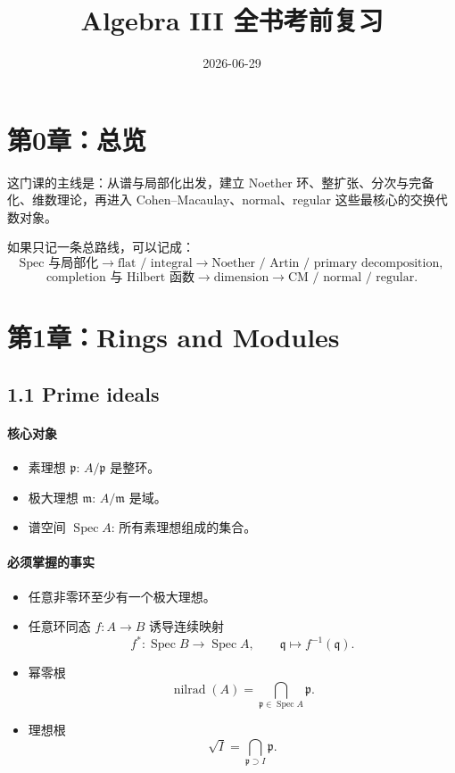 \documentclass[a4paper]{ctexart}
\title{Algebra III 全书考前复习}
\author{}
\date{2026-06-29}
\begin{document}
\maketitle
\tableofcontents

\section*{第0章：总览}
{}

这门课的主线是：从谱与局部化出发，建立 Noether 环、整扩张、分次与完备化、维数理论，再进入
Cohen--Macaulay、normal、regular 这些最核心的交换代数对象。

如果只记一条总路线，可以记成：
\[
\text{Spec 与局部化}
\to
\text{flat / integral}
\to
\text{Noether / Artin / primary decomposition},
\]
\[
\text{completion 与 Hilbert 函数}
\to
\text{dimension}
\to
\text{CM / normal / regular}.
\]

\section{第1章：Rings and Modules}

\subsection{1.1 Prime ideals}

\paragraph{核心对象}
\begin{itemize}
  \item 素理想 \(\mathfrak p\): \(A/\mathfrak p\) 是整环。
  \item 极大理想 \(\mathfrak m\): \(A/\mathfrak m\) 是域。
  \item 谱空间 \(\operatorname{Spec}A\): 所有素理想组成的集合。
\end{itemize}

\paragraph{必须掌握的事实}
\begin{itemize}
  \item 任意非零环至少有一个极大理想。
  \item 任意环同态 \(f:A\to B\) 诱导连续映射
  \[
    f^*:\operatorname{Spec}B\to \operatorname{Spec}A,\qquad
    \mathfrak q\mapsto f^{-1}(\mathfrak q).
  \]
  \item 幂零根
  \[
    \operatorname{nilrad}(A)=\bigcap_{\mathfrak p\in \operatorname{Spec}A}\mathfrak p.
  \]
  \item 理想根
  \[
    \sqrt I=\bigcap_{\mathfrak p\supset I}\mathfrak p.
  \]
\end{itemize}
\end{document}
